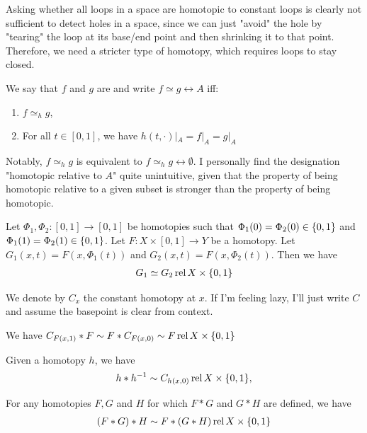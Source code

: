 Asking whether all loops in a space are homotopic to constant loops is clearly not sufficient to detect holes in a space, since we can just "avoid" the hole by "tearing" the loop at its base/end point and then shrinking it to that point. Therefore, we need a stricter type of homotopy, which requires loops to stay closed.
\begin{definition}
	We say that $f$ and $g$ are  and write $f \simeq g \rel A$ iff:
	\begin{enumerate}
		\item $f \simeq_h g$,
		\item For all $t \in [0,1]$, we have $h(t, \cdot)|_A = f|_A = g|_A$
	\end{enumerate}
\end{definition}
Notably, $f \simeq_h g$ is equivalent to $f \simeq_h g \rel \emptyset$.
\newpar
I personally find the designation "homotopic relative to $A$" quite unintuitive, given that the property of being homotopic relative to a given subset is stronger than the property of being homotopic.
\begin{theorem}
	Let $\Phi_1, \Phi_2 : [0,1] \to [0,1]$ be homotopies such that $\Phi_1(0) = \Phi_2(0) \in \qty{0,1}$ and $\Phi_1(1) = \Phi_2(1) \in \qty{0,1}$. Let $F : X \times [0,1] \to Y$ be a homotopy. Let $G_1(x,t) = F(x, \Phi_1(t))$ and $G_2(x,t) = F(x, \Phi_2(t))$. Then we have
	\begin{align*}
		G_1 \simeq G_2 \operatorname{rel} X \times \qty{0,1}
	\end{align*}
\end{theorem}
\begin{definition}
	We denote by $C_x$ the constant homotopy at $x$. If I'm feeling lazy, I'll just write $C$ and assume the basepoint is clear from context.
\end{definition}
\begin{exercise}
	We have $C_{F(x,1)} * F \sim F * C_{F(x,0)} \sim F \operatorname{rel} X \times \qty{0,1}$
\end{exercise}
\begin{exercise}
	Given a homotopy $h$, we have
	\begin{align*}
		h * h^{-1} \sim C_{h(x,0)} \operatorname{rel} X \times \qty{0,1},
	\end{align*}
\end{exercise}
\begin{exercise}
	For any homotopies $F, G$ and $H$ for which $F * G$ and $G * H$ are defined, we have
	\begin{align*}
		(F * G) * H \sim F * (G * H) \operatorname{rel} X \times \qty{0,1}
	\end{align*}
\end{exercise}

